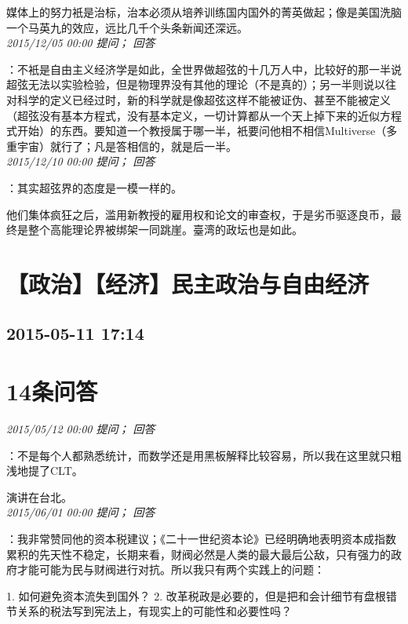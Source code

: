 \documentclass[twocolumn]{ctexart}
\begin{document}
媒体上的努力衹是治标，治本必须从培养训练国内国外的菁英做起；像是美国洗脑一个马英九的效应，远比几千个头条新闻还深远。\\

\textit{\hfill\noindent\small 2015/12/05 00:00 提问； 回答}

：不衹是自由主义经济学是如此，全世界做超弦的十几万人中，比较好的那一半说超弦无法以实验检验，但是物理界没有其他的理论（不是真的）；另一半则说以往对科学的定义已经过时，新的科学就是像超弦这样不能被证伪、甚至不能被定义（超弦没有基本方程式，没有基本定义，一切计算都从一个天上掉下来的近似方程式开始）的东西。要知道一个教授属于哪一半，衹要问他相不相信Multiverse（多重宇宙）就行了；凡是答相信的，就是后一半。\\

\textit{\hfill\noindent\small 2015/12/10 00:00 提问； 回答}

：其实超弦界的态度是一模一样的。

他们集体疯狂之后，滥用新教授的雇用权和论文的审查权，于是劣币驱逐良币，最终是整个高能理论界被绑架一同跳崖。臺湾的政坛也是如此。\\


\section{【政治】【经济】民主政治与自由经济}
\subsection{2015-05-11 17:14}


\section{14条问答}

\textit{\hfill\noindent\small 2015/05/12 00:00 提问； 回答}

：不是每个人都熟悉统计，而数学还是用黑板解释比较容易，所以我在这里就只粗浅地提了CLT。

演讲在台北。\\

\textit{\hfill\noindent\small 2015/06/01 00:00 提问； 回答}

：我非常赞同他的资本税建议；《二十一世纪资本论》已经明确地表明资本成指数累积的先天性不稳定，长期来看，财阀必然是人类的最大最后公敌，只有强力的政府才能可能为民与财阀进行对抗。所以我只有两个实践上的问题：

1. 如何避免资本流失到国外？
2. 改革税政是必要的，但是把和会计细节有盘根错节关系的税法写到宪法上，有现实上的可能性和必要性吗？\\
\end{document}

